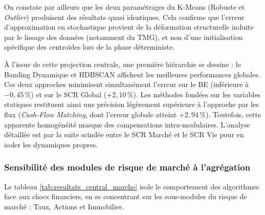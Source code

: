 On constate par ailleurs que les deux paramétrages du K-Means (Robuste et \textit{Outlier}) produisent des résultats quasi identiques. Cela confirme que l'erreur d'approximation en stochastique provient de la déformation structurelle induite par le lissage des données (notamment du TMG), et non d'une initialisation spécifique des centroïdes lors de la phase déterministe. 

À l'issue de cette projection centrale, une première hiérarchie se dessine : le Banding Dynamique et HDBSCAN affichent les meilleures performances globales. Ces deux approches minimisent simultanément l'erreur sur le BE (inférieure à $-0{,}45\,\%$) et sur le SCR Global ($+2{,}10\,\%$). Les méthodes fondées sur les variables statiques restituent ainsi une précision légèrement supérieure à l'approche par les flux (\textit{Cash-Flow Matching}, dont l'erreur globale atteint $+2{,}94\,\%$). Toutefois, cette apparente homogénéité masque des compensations intra-modulaires. L'analyse détaillée est par la suite scindée entre le SCR Marché et le SCR Vie pour en isoler les dynamiques propres.

\subsubsection{Sensibilité des modules de risque de marché à l'agrégation}

Le tableau \ref{tab:resultats_central_marche} isole le comportement des algorithmes face aux chocs financiers, en se concentrant sur les sous-modules du risque de marché : Taux, Actions et Immobilier.

